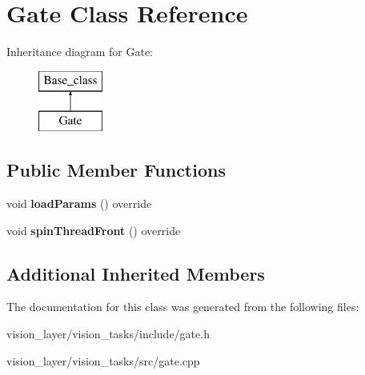 \hypertarget{classGate}{}\section{Gate Class Reference}
\label{classGate}
Inheritance diagram for Gate\+:\begin{figure}[H]
\begin{center}
\leavevmode
\includegraphics[height=2.000000cm]{classGate}
\end{center}
\end{figure}
\subsection*{Public Member Functions}
\begin{DoxyCompactItemize}
\item 
\mbox{\label{classGate_a84014be339079ee8c26e5c627cf74172}} 
void {\bfseries load\+Params} () override
\item 
\mbox{\label{classGate_a91e5885a819d7155f4ee660126f0dc7e}} 
void {\bfseries spin\+Thread\+Front} () override
\end{DoxyCompactItemize}
\subsection*{Additional Inherited Members}


The documentation for this class was generated from the following files\+:\begin{DoxyCompactItemize}
\item 
vision\+\_\+layer/vision\+\_\+tasks/include/gate.\+h\item 
vision\+\_\+layer/vision\+\_\+tasks/src/gate.\+cpp\end{DoxyCompactItemize}
